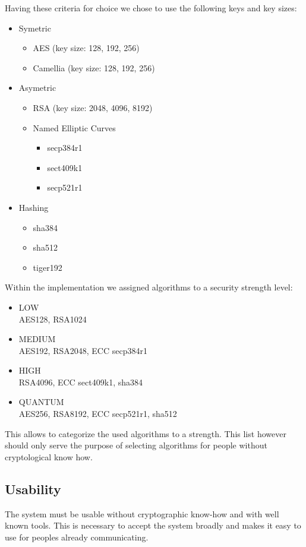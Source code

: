 Having these criteria for choice we chose to use the following keys and key sizes:
\begin{itemize}
	\item Symetric
	\begin{itemize}
		\item AES (key size: 128, 192, 256)
		\item Camellia (key size: 128, 192, 256)
	\end{itemize}
	\item Asymetric
	\begin{itemize}
		\item RSA (key size: 2048, 4096, 8192)
		\item Named Elliptic Curves
		\begin{itemize}
			\item secp384r1
			\item sect409k1
			\item secp521r1
		\end{itemize}
	\end{itemize}
	\item Hashing
	\begin{itemize}
		\item sha384
		\item sha512
		\item tiger192
	\end{itemize}
\end{itemize}

Within the implementation we assigned algorithms to a security strength level:
\begin{itemize}
	\item LOW\\
	      AES128, RSA1024
	\item MEDIUM\\
	      AES192, RSA2048, ECC secp384r1
	\item HIGH\\
		  RSA4096, ECC sect409k1, sha384
	\item QUANTUM\\
	      AES256, RSA8192, ECC secp521r1, sha512
\end{itemize}

This allows to categorize the used algorithms to a strength. This list however should only serve the purpose of selecting algorithms for people without cryptological know how.


\subsection{Usability}
The system must be usable without cryptographic know-how and with well known tools. This is necessary to accept the system broadly and makes it easy to use for peoples already communicating.

